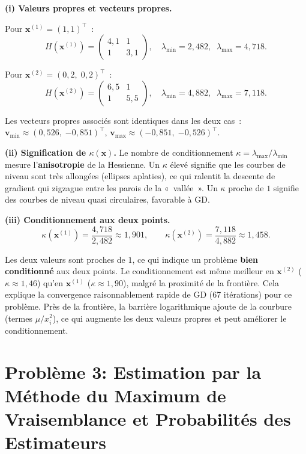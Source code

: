\documentclass[12pt,letterpaper]{article}
\begin{document}
\textbf{(i) Valeurs propres et vecteurs propres.}

Pour $\mathbf{x}^{(1)} = (1, 1)^\top$~: %
\[
H(\mathbf{x}^{(1)}) = \begin{pmatrix} 4{,}1 & 1 \\ 1 & 3{,}1 \end{pmatrix}, \quad
\lambda_{\min} = 2{,}482,\;\; \lambda_{\max} = 4{,}718.
\]

Pour $\mathbf{x}^{(2)} = (0{,}2,\; 0{,}2)^\top$~: %
\[
H(\mathbf{x}^{(2)}) = \begin{pmatrix} 6{,}5 & 1 \\ 1 & 5{,}5 \end{pmatrix}, \quad
\lambda_{\min} = 4{,}882,\;\; \lambda_{\max} = 7{,}118.
\]

Les vecteurs propres associés sont identiques dans les deux cas~:
$\mathbf{v}_{\min} \approx (0{,}526,\; {-0{,}851})^\top$, %
$\mathbf{v}_{\max} \approx (-0{,}851,\; {-0{,}526})^\top$. %

\textbf{(ii) Signification de $\kappa(\mathbf{x})$.}
Le nombre de conditionnement $\kappa = \lambda_{\max}/\lambda_{\min}$ mesure l'\textbf{anisotropie} de la Hessienne.
Un $\kappa$ élevé signifie que les courbes de niveau sont très allongées (ellipses aplaties), ce qui ralentit la descente de gradient qui zigzague entre les parois de la «~vallée~».
Un $\kappa$ proche de $1$ signifie des courbes de niveau quasi circulaires, favorable à GD\@.

\textbf{(iii) Conditionnement aux deux points.}
\[
\kappa(\mathbf{x}^{(1)}) = \frac{4{,}718}{2{,}482} \approx 1{,}901, \qquad
\kappa(\mathbf{x}^{(2)}) = \frac{7{,}118}{4{,}882} \approx 1{,}458.
\]

Les deux valeurs sont proches de $1$, ce qui indique un problème \textbf{bien conditionné} aux deux points.
Le conditionnement est même meilleur en $\mathbf{x}^{(2)}$ ($\kappa \approx 1{,}46$) qu'en $\mathbf{x}^{(1)}$ ($\kappa \approx 1{,}90$), malgré la proximité de la frontière.
Cela explique la convergence raisonnablement rapide de GD (67 itérations) pour ce problème.
Près de la frontière, la barrière logarithmique ajoute de la courbure (termes $\mu/x_i^2$), ce qui augmente les deux valeurs propres et peut améliorer le conditionnement.

\section{Problème 3: Estimation par la Méthode du Maximum de Vraisemblance et Probabilités des Estimateurs}
\end{document}
